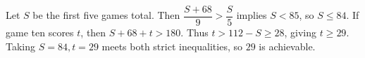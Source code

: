 Let $S$ be the first five games\textquotesingle{} total. Then $\dfrac{S+68}{9}>\dfrac{S}{5}$ implies $S<85$, so $S\le84$. If game ten scores $t$, then $S+68+t>180$. Thus $t>112-S\ge28$, giving $t\ge29$. Taking $S=84,t=29$ meets both strict inequalities, so $\boxed{29}$ is achievable.
